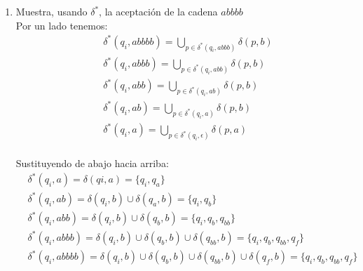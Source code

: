 \documentclass{article}
\begin{document}
\begin{enumerate}
\begin{enumerate}
\begin{center}
        \end{center}
        
        \item Muestra, usando $\delta^*$, la aceptación de la cadena $abbbb$\\
        Por un lado tenemos:\\
        \begin{align*}
        &\delta^*(q_i, abbbb) = \bigcup_{p \in \delta^*(q_i, abbb)} \delta(p,b) \\
        &\delta^*(q_i, abbb) = \bigcup_{p \in \delta^*(q_i, abb)} \delta(p,b)\\
        &\delta^*(q_i, abb) = \bigcup_{p \in \delta^*(q_i, ab)} \delta(p,b)\\
        &\delta^*(q_i, ab) = \bigcup_{p \in \delta^*(q_i, a)} \delta(p,b)\\
        &\delta^*(q_i, a) = \bigcup_{p \in \delta^*(q_i, \epsilon)} \delta(p,a)\\
        \end{align*}

        Sustituyendo de abajo hacia arriba:
        \begin{align*}
        &\delta^*(q_i, a) = \delta(qi,a) = \{q_i, q_a\}\\
        &\delta^*(q_i, ab) = \delta(q_i, b) \cup \delta(q_a,b) = \{q_i, q_b\}\\
        &\delta^*(q_i, abb) = \delta(q_i, b) \cup \delta(q_b,b) = \{q_i, q_b, q_{bb}\}\\
        &\delta^*(q_i, abbb) = \delta(q_i, b) \cup \delta(q_b, b) \cup \delta(q_{bb},b) = \{q_i, q_b, q_{bb},q_f\}\\
        &\delta^*(q_i, abbbb) = \delta(q_i,b) \cup \delta(q_b, b) \cup \delta(q_{bb},b) \cup \delta(q_f,b) = \{q_i, q_b, q_{bb}, q_f\}\\
        \end{align*}


\end{enumerate}
\end{enumerate}
\end{document}
